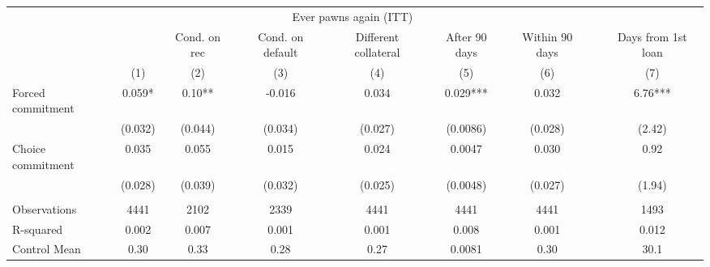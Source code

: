 \begin{tabular}{lcccccccc}
\toprule
      & \multicolumn{6}{c}{Ever pawns again (ITT)}    &       &  \\
\cmidrule{2-7}      &       & Cond. on rec & Cond. on default & Different collateral & After 90 days & Within 90 days &       & Days from 1st loan  \\
\midrule
\midrule
      & (1)   & (2)   & (3)   & (4)   & (5)   & (6)   &       & (7) \\
\midrule
\midrule
Forced commitment & 0.059* & 0.10** & -0.016 & 0.034 & 0.029*** & 0.032 &       & 6.76*** \\
      & (0.032) & (0.044) & (0.034) & (0.027) & (0.0086) & (0.028) &       & (2.42) \\
Choice commitment & 0.035 & 0.055 & 0.015 & 0.024 & 0.0047 & 0.030 &       & 0.92 \\
      & (0.028) & (0.039) & (0.032) & (0.025) & (0.0048) & (0.027) &       & (1.94) \\
      &       &       &       &       &       &       &       &  \\
\midrule
Observations & 4441  & 2102  & 2339  & 4441  & 4441  & 4441  &       & 1493 \\
R-squared & 0.002 & 0.007 & 0.001 & 0.001 & 0.008 & 0.001 &       & 0.012 \\
Control Mean & 0.30  & 0.33  & 0.28  & 0.27  & 0.0081 & 0.30  &       & 30.1 \\
\bottomrule
\bottomrule
\end{tabular}%
